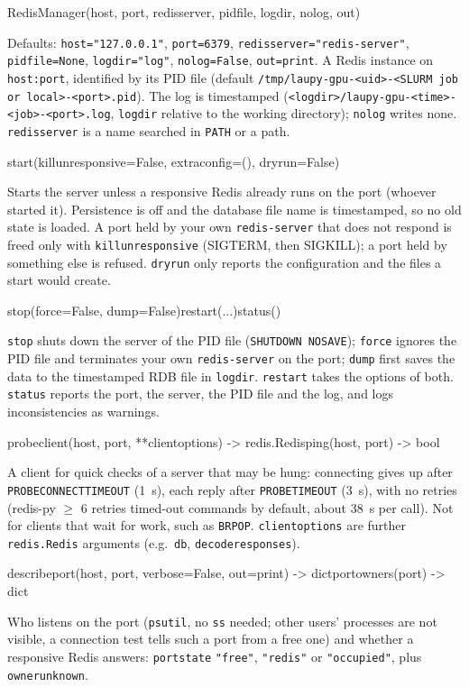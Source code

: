 \documentclass[11pt,a4paper]{article}
\newcommand{\api}[1]{%
  \par\medskip
  \begin{tcolorbox}[colback=sigbg, colframe=sigbg, boxrule=0pt, arc=1pt, left=4pt, right=4pt, top=2pt, bottom=2pt, breakable]
  \raggedright\ttfamily\small #1
  \end{tcolorbox}\nopagebreak\vspace{-4pt}%
}
\DeclareRobustCommand{\_}{\textunderscore\allowbreak}
\newcommand{\cmd}[1]{\texttt{#1}}
\begin{document}
\api{RedisManager(host, port, redis\_server, pidfile, log\_dir, no\_log, out)}
Defaults: \cmd{host="127.0.0.1"}, \cmd{port=6379}, \cmd{redis\_server="redis-server"},
\cmd{pidfile=None}, \cmd{log\_dir="log"}, \cmd{no\_log=False}, \cmd{out=print}.
A Redis instance on \cmd{host:port}, identified by its PID file (default
\cmd{/tmp/laupy-gpu-<uid>-<SLURM job or local>-<port>.pid}). The log is timestamped
(\cmd{<log\_dir>/laupy-gpu-<time>-<job>-<port>.log}, \cmd{log\_dir} relative to the working
directory); \cmd{no\_log} writes none. \cmd{redis\_server} is a name searched in \cmd{PATH} or a path.

\api{start(kill\_unresponsive=False, extra\_config=(), dry\_run=False)}
Starts the server unless a responsive Redis already runs on the port (whoever started it). Persistence
is off and the database file name is timestamped, so no old state is loaded. A port held by your own
\cmd{redis-server} that does not respond is freed only with \cmd{kill\_unresponsive} (SIGTERM, then
SIGKILL); a port held by something else is refused. \cmd{dry\_run} only reports the configuration and
the files a start would create.

\api{stop(force=False, dump=False)\quad restart(...)\quad status()}
\cmd{stop} shuts down the server of the PID file (\cmd{SHUTDOWN NOSAVE}); \cmd{force} ignores the PID
file and terminates your own \cmd{redis-server} on the port; \cmd{dump} first saves the data to the
timestamped RDB file in \cmd{log\_dir}. \cmd{restart} takes the options of both. \cmd{status} reports
the port, the server, the PID file and the log, and logs inconsistencies as warnings.

\api{probe\_client(host, port, **client\_options) -> redis.Redis\quad ping(host, port) -> bool}
A client for quick checks of a server that may be hung: connecting gives up after
\cmd{PROBE\_CONNECT\_TIMEOUT} (1~s), each reply after \cmd{PROBE\_TIMEOUT} (3~s), with no retries
(redis-py $\geq$ 6 retries timed-out commands by default, about 38~s per call). Not for clients that
wait for work, such as \cmd{BRPOP}. \cmd{client\_options} are further \cmd{redis.Redis} arguments
(e.g.\ \cmd{db}, \cmd{decode\_responses}).

\api{describe\_port(host, port, verbose=False, out=print) -> dict\quad port\_owners(port) -> dict}
Who listens on the port (\cmd{psutil}, no \cmd{ss} needed; other users' processes are not visible, a
connection test tells such a port from a free one) and whether a responsive Redis answers:
\cmd{port\_state} \cmd{"free"}, \cmd{"redis"} or \cmd{"occupied"}, plus \cmd{owner\_unknown}.
\end{document}
